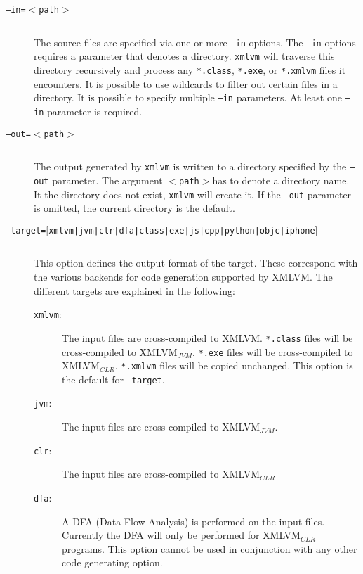 \documentclass[12pt]{article}
\newcommand{\xmlvm}{\texttt{xmlvm} }
\begin{document}
\begin{description}

\item[\texttt{--in=$<$path$>$}] $ $

  The source files are specified via one or more \texttt{--in}
  options. The \texttt{--in} options requires a parameter that denotes
  a directory. \xmlvm will traverse this directory recursively and
  process any \texttt{*.class}, \texttt{*.exe}, or \texttt{*.xmlvm}
  files it encounters. It is possible to use wildcards to filter out
  certain files in a directory. It is possible to specify multiple
  \texttt{--in} parameters. At least one \texttt{--in} parameter is
  required.

\item[\texttt{--out=$<$path$>$}] $ $

  The output generated by \xmlvm is written to a directory specified
  by the \texttt{--out} parameter.  The argument
  \texttt{$<$path$>$}has to denote a directory name. It the directory
  does not exist, \xmlvm will create it. If the \texttt{--out}
  parameter is omitted, the current directory is the default.

\item[\texttt{--target=$[$xmlvm|jvm|clr|dfa|class|exe|js|cpp|python|objc|iphone$]$}]
  $ $

  This option defines the output format of the target. These
  correspond with the various backends for code generation supported
  by XMLVM. The different targets are explained in the following:

\begin{description}
\item[\texttt{xmlvm}:] The input files are cross-compiled to XMLVM.
  \texttt{*.class} files will be cross-compiled to XMLVM$_{JVM}$.
  \texttt{*.exe} files will be cross-compiled to XMLVM$_{CLR}$.
  \texttt{*.xmlvm} files will be copied unchanged. This option is the
  default for \texttt{--target}.

\item[\texttt{jvm}:] The input files are cross-compiled to
  XMLVM$_{JVM}$.

\item[\texttt{clr}:] The input files are cross-compiled to
  XMLVM$_{CLR}$

\item[\texttt{dfa}:] A DFA (Data Flow Analysis) is performed on the
  input files. Currently the DFA will only be performed for
  XMLVM$_{CLR}$ programs. This option cannot be used in conjunction
  with any other code generating option.


\end{description}
\end{description}
\end{document}
